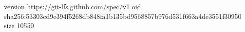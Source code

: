 version https://git-lfs.github.com/spec/v1
oid sha256:53303cd9e394f5268db848fa1b135bd9568857b976d531f663a4de3551f30950
size 10550
